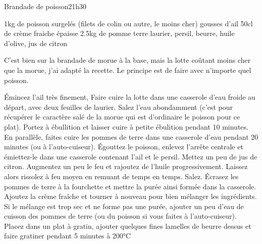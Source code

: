 \begin{recette}{Brandade de poisson}{2}{1h30}{}
\begin{ingredients}
\ingredient 1kg de poisson surgelés (filets de colin ou autre, le moins cher)
 gousses d'ail
\ingredient 50cl de crème fraiche épaisse
\ingredient 2.5kg de pomme terre
\ingredient laurier, persil, beurre, huile d'olive, jus de citron
\end{ingredients}

\begin{remarque}
C'est bien sur la brandade de morue à la base, mais la lotte coûtant moins cher que la morue, j'ai adapté la recette. Le principe est de faire avec n'importe quel poisson.
\end{remarque}


\begin{preparation}
\etape Émincez l'ail très finement, 
\etape Faire cuire la lotte dans une casserole d'eau froide au départ, avec deux feuilles de laurier. Salez l'eau abondamment (c'est pour récupérer le caractère salé de la morue qui est d'ordinaire le poisson pour ce plat). Portez à ébullition et laisser cuire à petite ébulition pendant 10 minutes.
\etape En parallèle, faites cuire les pommes de terre dans une casserole d'eau pendant 20 minutes (ou à l'auto-cuiseur).
\etape Égouttez le poisson, enlevez l'arrête centrale et émiettez-le dans une casserole contenant l'ail et le persil. Mettez un peu de jus de citron. Augmentez un peu le feu et rajoutez de l'huile progressivement. Laissez alors rissolez à feu moyen en remuant de temps en temps. Salez.
\etape Écrasez les pommes de terre à la fourchette et mettre la purée ainsi formée dans la casserole.
\etape Ajoutez la crème fraîche et tourner à nouveau pour bien mélanger les ingrédients. Si le mélange est trop sec et ne forme pas une purée, ajouter un peu d'eau de cuisson des pommes de terre (ou du poisson si vous faites à l'auto-cuiseur).
\etape Placez dans un plat à gratin, ajouter quelques fines lamelles de beurre dessus et faire gratiner pendant 5 minutes à 200°C
\end{preparation}

\end{recette}

